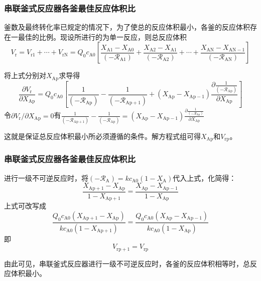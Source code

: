 \documentclass[dvipsnames, svgnames, x11names]{beamer}
\begin{document}
\begin{frame}
    \frametitle{串联釜式反应器各釜最佳反应体积比}

    釜数及最终转化率已规定的情况下，为了使总的反应体积最小，各釜的反应体积存在一最佳的比例。现设所进行的为单一反应，则总反应体积
    \[
        V_{\mathrm{r}}=V_{\mathrm{r} 1}+\cdots+V_{\mathrm{rN}}=Q_{0} c_{\mathrm{A} 0}\left[\frac{X_{\mathrm{A} 1}-X_{\mathrm{A} 0}}{\left(-\mathscr{R}_{\mathrm{A} 1}\right)}+\frac{X_{\mathrm{A} 2}-X_{\mathrm{A} 1}}{\left(-\mathscr{R}_{\mathrm{A} 2}\right)}+\cdots+\frac{X_{\mathrm{AN}}-X_{\mathrm{AN}-1}}{\left(-\mathscr{R}_{\mathrm{AN}}\right)}\right]
    \]

    将上式分别对$X_\mathrm{Ap}$求导得
    \[
        \frac{\partial V_{\mathrm{r}}}{\partial X_{\mathrm{Ap}}}=Q_{0} c_{\mathrm{A} 0}\left[\frac{1}{\left(-\mathscr{R}_{\mathrm{Ap}}\right)}-\frac{1}{\left(-\mathscr{R}_{\mathrm{Ap}+1}\right)}+\left(X_{\mathrm{Ap}}-X_{\mathrm{Ap}-1}\right) \frac{\partial \frac{1}{\left(-\mathscr{R}_{\mathrm{Ap}}\right)}}{\partial X_{\mathrm{Ap}}}\right]
    \]
    令${\partial V_{\mathrm{r}}}/{\partial X_{\mathrm{Ap}}}=0$有$\frac{1}{\left(-\mathscr{R}_{\mathrm{Ap}+1}\right)}-\frac{1}{\left(-\mathscr{R}_{\mathrm{Ap}}\right)}=\left(X_{\mathrm{Ap}}-X_{\mathrm{Ap}-1}\right) \frac{\partial \frac{1}{\left(-\mathscr{R}_{\mathrm{Ap}}\right)}}{\partial X_{\mathrm{Ap}}}$
    
    这就是保证总反应体积最小所必须遵循的条件。解方程式组可得$X_{\mathrm{Ap}}$和$V_{\mathrm{rp}}$。
    
\end{frame}


\begin{frame}
    \frametitle{串联釜式反应器各釜最佳反应体积比}

    进行一级不可逆反应时，将$(-\mathscr{R}_\mathrm{A})=k c_{\mathrm{A} 0}(1-X_\mathrm{A})$代入上式，化简得：
    \[
        \frac{X_{\mathrm{Ap}+1}-X_{\mathrm{Ap}}}{1-X_{\mathrm{Ap}+1}}=\frac{X_{\mathrm{Ap}}-X_{\mathrm{Ap}-1}}{1-X_{\mathrm{Ap}}}
    \]
    上式可改写成
    \[
        \frac{Q_{0} c_{\mathrm{A} 0}(X_{\mathrm{Ap}+1}-X_{\mathrm{Ap}})}{k c_{\mathrm{A} 0}(1-X_{\mathrm{Ap}+1})}=\frac{Q_{0} c_{\mathrm{A} 0}(X_{\mathrm{Ap}}-X_{\mathrm{Ap}-1})}{k c_{\mathrm{A} 0}(1-X_{\mathrm{Ap}})}
    \]
    即\[V_{\mathrm{rp}+1}=V_{\mathrm{rp}}\]

    由此可见，串联釜式反应器进行一级不可逆反应时，各釜的反应体积相等时，总反应体积最小。

\end{frame}
\end{document}
